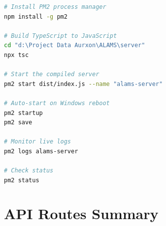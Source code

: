 \begin{tcolorbox}[codebox, title={Production Deployment with PM2}]
\begin{lstlisting}[language=bash]
# Install PM2 process manager
npm install -g pm2

# Build TypeScript to JavaScript
cd "d:\Project Data Aurxon\ALAMS\server"
npx tsc

# Start the compiled server
pm2 start dist/index.js --name "alams-server"

# Auto-start on Windows reboot
pm2 startup
pm2 save

# Monitor live logs
pm2 logs alams-server

# Check status
pm2 status
\end{lstlisting}
\end{tcolorbox}

\section{API Routes Summary}


